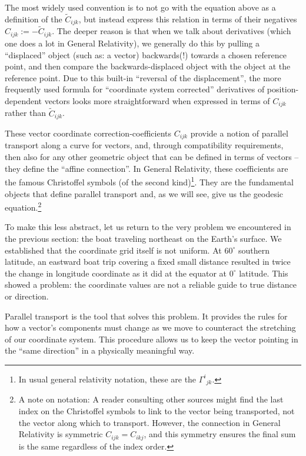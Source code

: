 \documentclass[twocolumn]{article}
\begin{document}
The most widely used convention is to not go with the equation above
as a definition of the $\tilde C_{ijk}$, but instead express this
relation in terms of their negatives $C_{ijk}:=-\tilde C_{ijk}$. The
deeper reason is that when we talk about derivatives (which one does a
lot in General Relativity), we generally do this by pulling a
``displaced'' object (such as: a vector) backwards(!) towards a chosen
reference point, and then compare the backwards-displaced object with
the object at the reference point.  Due to this built-in ``reversal of
the displacement'', the more frequently used formula for ``coordinate
system corrected'' derivatives of position-dependent vectors looks
more straightforward when expressed in terms of $C_{ijk}$ rather than
$\tilde C_{ijk}$.

These vector coordinate correction-coefficients \(C_{ijk}\) provide a
notion of parallel transport along a curve for vectors, and, through
compatibility requirements, then also for any other geometric object
that can be defined in terms of vectors -- they define the ``affine
connection''. In General Relativity, these coefficients are the famous
Christoffel symbols (of the second kind)\footnote{In usual general
relativity notation, these are the \(\Gamma^i{}_{jk}\).}. They are the
fundamental objects that define parallel transport and, as we will
see, give us the geodesic equation.\footnote{A note on notation: A
reader consulting other sources might find the last index on the
Christoffel symbols to link to the vector being transported, not the
vector along which to transport. However, the connection in General
Relativity is symmetric \(C_{ijk}=C_{ikj}\), and this symmetry ensures
the final sum is the same regardless of the index order.}

To make this less abstract, let us return to the very problem we
encountered in the previous section: the boat traveling northeast on
the Earth's surface. We established that the coordinate grid itself is
not uniform. At $60^\circ$ southern latitude, an eastward boat trip
covering a fixed small distance resulted in twice the change in
longitude coordinate as it did at the equator at $0^\circ$
latitude. This showed a problem: the coordinate values are not a
reliable guide to true distance or direction.

Parallel transport is the tool that solves this problem. It provides the
rules for how a vector's components must change as we move to counteract
the stretching of our coordinate system. This procedure allows us to
keep the vector pointing in the ``same direction'' in a physically
meaningful way.
\end{document}

